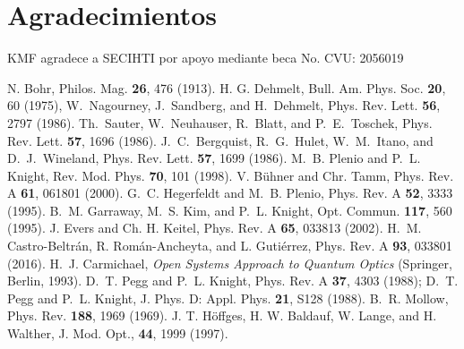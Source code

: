 \documentclass[superscriptaddress,12pt,amsmath]{revtex4-2}
\begin{document}
\section{Agradecimientos} 
KMF agradece a SECIHTI por apoyo mediante beca No. CVU: 2056019 

\begin{references} %
%
 N. Bohr, Philos. Mag. \textbf{26}, 476 (1913).   
%
 H. G. Dehmelt, Bull. Am. Phys. Soc. \textbf{20}, 60 
(1975),
%
 W.~Nagourney, J.~Sandberg, and H.~Dehmelt,  
Phys. Rev. Lett. \textbf{56}, 2797 (1986).
%
 Th.~Sauter, W.~Neuhauser, R.~Blatt, and P.~E.~Toschek,   
Phys. Rev. Lett. \textbf{57}, 1696 (1986).
%
 J.~C.~Bergquist, R.~G.~Hulet, W.~M.~Itano, and 
D.~J.~Wineland, Phys. Rev. Lett. \textbf{57}, 1699 (1986).
%
 M.~B. Plenio and P.~L. Knight, Rev. Mod. Phys. 
\textbf{70}, 101 (1998). 
%
 V. B\"uhner and Chr. Tamm, Phys. Rev. A 
	\textbf{61}, 061801 (2000). 
%
 G.~C. Hegerfeldt and M.~B. Plenio, Phys. Rev. A 
\textbf{52}, 3333 (1995). 
%
 B.~M. Garraway, M.~S. Kim, and P.~L. Knight, 
	Opt. Commun. \textbf{117}, 560 (1995).
%
 J. Evers and Ch. H. Keitel, Phys. Rev. A 
\textbf{65}, 033813 (2002). 
%
 H.~M. Castro-Beltr\'an, R. Rom\'an-Ancheyta, and 
L. Guti\'errez, Phys. Rev. A \textbf{93}, 033801 (2016). 
%
 H.~J. Carmichael, \textit{Open Systems Approach to 
Quantum Optics} (Springer, Berlin, 1993). 
%
 D.~T. Pegg and P.~L. Knight, Phys. Rev. A 
\textbf{37}, 4303 (1988);  D.~T. Pegg and P.~L. Knight, J. Phys. D: 
Appl. Phys. \textbf{21}, S128 (1988). 
%
 B.~R. Mollow, Phys. Rev. \textbf{188}, 1969 (1969). 
%
 J. T. H\"offges, H. W. Baldauf, W. Lange, and 
H. Walther, J. Mod. Opt., \textbf{44}, 1999 (1997). 
%


\end{references} %
\end{document}

